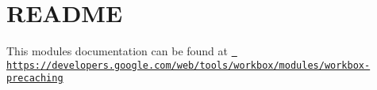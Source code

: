 \chapter{README}
\hypertarget{md_pkiclassroomrescheduler_2src_2main_2frontend_2node__modules_2workbox-precaching_2_r_e_a_d_m_e}{}\label{md_pkiclassroomrescheduler_2src_2main_2frontend_2node__modules_2workbox-precaching_2_r_e_a_d_m_e}
This module\textquotesingle{}s documentation can be found at \href{https://developers.google.com/web/tools/workbox/modules/workbox-precaching}{\texttt{ https\+://developers.\+google.\+com/web/tools/workbox/modules/workbox-\/precaching}} 